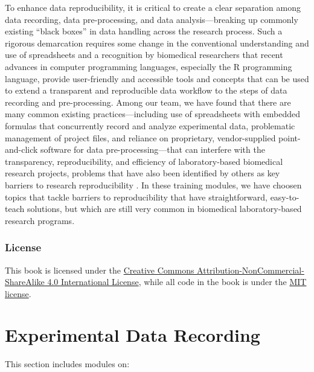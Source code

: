 \documentclass[]{tufte-book}
\begin{document}
To enhance data reproducibility, it is critical to create a clear separation
among data recording, data pre-processing, and data analysis---breaking up
commonly existing ``black boxes'' in data handling across the research process.
Such a rigorous demarcation requires some change in the conventional
understanding and use of spreadsheets and a recognition by biomedical
researchers that recent advances in computer programming languages, especially
the R programming language, provide user-friendly and accessible tools and
concepts that can be used to extend a transparent and reproducible data workflow
to the steps of data recording and pre-processing. Among our team, we have found
that there are many common existing practices---including use of spreadsheets
with embedded formulas that concurrently record and analyze experimental data,
problematic management of project files, and reliance on proprietary,
vendor-supplied point-and-click software for data pre-processing---that can
interfere with the transparency, reproducibility, and efficiency of
laboratory-based biomedical research projects, problems that have also been
identified by others as key barriers to research reproducibility
\citep{broman2018data, bryan2018excuse, ellis2018share, marwick2018packaging}. In
these training modules, we have choosen topics that tackle barriers to
reproducibility that have straightforward, easy-to-teach solutions, but which
are still very common in biomedical laboratory-based research programs.

\subsection{License}\label{license}

This book is licensed under the \href{https://creativecommons.org/licenses/by-nc-sa/4.0/}{Creative Commons
Attribution-NonCommercial-ShareAlike 4.0 International
License}, while all code in
the book is under the \href{https://opensource.org/licenses/MIT}{MIT license}.

\chapter{Experimental Data Recording}\label{experimental-data-recording}

This section includes modules on:
\end{document}
